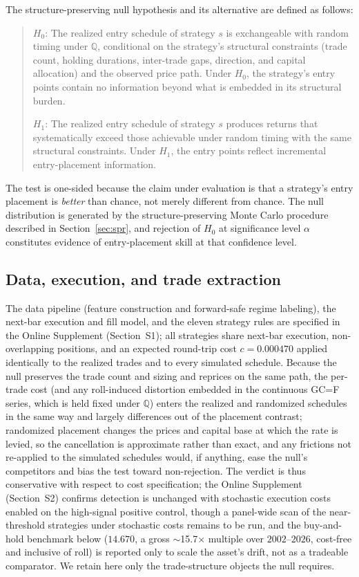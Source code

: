 \documentclass[preprint,12pt]{elsarticle}
\theoremstyle{definition}
\begin{document}
The structure-preserving null hypothesis and its alternative are defined as follows:
\begin{quote}
$H_0$: The realized entry schedule of strategy $s$ is exchangeable with random timing under $\mathbb{Q}$, conditional on the strategy's structural constraints (trade count, holding durations, inter-trade gaps, direction, and capital allocation) and the observed price path. Under $H_0$, the strategy's entry points contain no information beyond what is embedded in its structural burden.

\medskip

$H_1$: The realized entry schedule of strategy $s$ produces returns that systematically exceed those achievable under random timing with the same structural constraints. Under $H_1$, the entry points reflect incremental entry-placement information.
\end{quote}

The test is one-sided because the claim under evaluation is that a strategy's entry placement is \emph{better} than chance, not merely different from chance. The null distribution is generated by the structure-preserving Monte Carlo procedure described in Section~\ref{sec:spr}, and rejection of $H_0$ at significance level $\alpha$ constitutes evidence of entry-placement skill at that confidence level.

\subsection{Data, execution, and trade extraction}

The data pipeline (feature construction and forward-safe regime labeling), the next-bar execution and fill model, and the eleven strategy rules are specified in the Online Supplement (Section~S1); all strategies share next-bar execution, non-overlapping positions, and an expected round-trip cost $c=0.000470$ applied identically to the realized trades and to every simulated schedule. Because the null preserves the trade count and sizing and reprices on the same path, the per-trade cost (and any roll-induced distortion embedded in the continuous GC=F series, which is held fixed under $\mathbb{Q}$) enters the realized and randomized schedules in the same way and largely differences out of the placement contrast; randomized placement changes the prices and capital base at which the rate is levied, so the cancellation is approximate rather than exact, and any frictions not re-applied to the simulated schedules would, if anything, ease the null's competitors and bias the test toward non-rejection. The verdict is thus conservative with respect to cost specification; the Online Supplement (Section~S2) confirms detection is unchanged with stochastic execution costs enabled on the high-signal positive control, though a panel-wide scan of the near-threshold strategies under stochastic costs remains to be run, and the buy-and-hold benchmark below ($14.670$, a gross $\sim$15.7$\times$ multiple over $2002$--$2026$, cost-free and inclusive of roll) is reported only to scale the asset's drift, not as a tradeable comparator. We retain here only the trade-structure objects the null requires.
\end{document}
